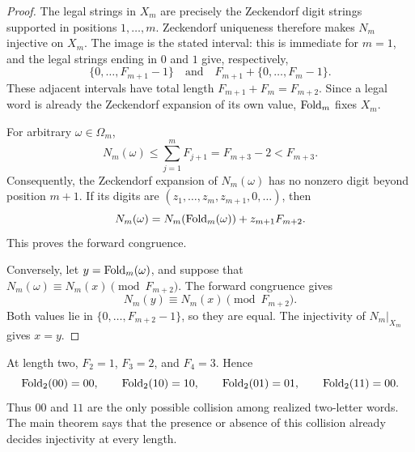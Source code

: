 \begin{proof}
The legal strings in \(X_m\) are precisely the Zeckendorf digit strings
supported in positions \(1,\ldots,m\).  Zeckendorf uniqueness therefore
makes \(N_m\) injective on \(X_m\).  The image is the stated interval: this
is immediate for \(m=1\), and the legal strings ending in \(0\) and \(1\)
give, respectively,
\[
\{0,\ldots,F_{m+1}-1\}
\quad\text{and}\quad
F_{m+1}+\{0,\ldots,F_m-1\}.
\]
These adjacent intervals have total length
\(F_{m+1}+F_m=F_{m+2}\).  Since a legal word is already the Zeckendorf
expansion of its own value, \(\operatorname{Fold}_m\) fixes \(X_m\).

For arbitrary \(\omega\in\Omega_m\),
\[
N_m(\omega)\leq\sum_{j=1}^mF_{j+1}
=F_{m+3}-2<F_{m+3}.
\]
Consequently, the Zeckendorf expansion of \(N_m(\omega)\) has no nonzero
digit beyond position \(m+1\).  If its digits are
\((z_1,\ldots,z_m,z_{m+1},0,\ldots)\), then
\[
N_m(\omega)=N_m(\operatorname{Fold}_m(\omega))+z_{m+1}F_{m+2}.
\]
This proves the forward congruence.

Conversely, let \(y=\operatorname{Fold}_m(\omega)\), and suppose that
\(N_m(\omega)\equiv N_m(x)\pmod{F_{m+2}}\).  The forward congruence gives
\[
N_m(y)\equiv N_m(x)\pmod{F_{m+2}}.
\]
Both values lie in \(\{0,\ldots,F_{m+2}-1\}\), so they are equal.
The injectivity of \(N_m|_{X_m}\) gives \(x=y\).
\end{proof}

\begin{remark}\label{rem:two-letter-fold}
At length two, \(F_2=1\), \(F_3=2\), and \(F_4=3\).  Hence
\[
\operatorname{Fold}_2(00)=00,\qquad
\operatorname{Fold}_2(10)=10,\qquad
\operatorname{Fold}_2(01)=01,\qquad
\operatorname{Fold}_2(11)=00.
\]
Thus \(00\) and \(11\) are the only possible collision among realized
two-letter words.  The main theorem says that the presence or absence of
this collision already decides injectivity at every length.
\end{remark}
